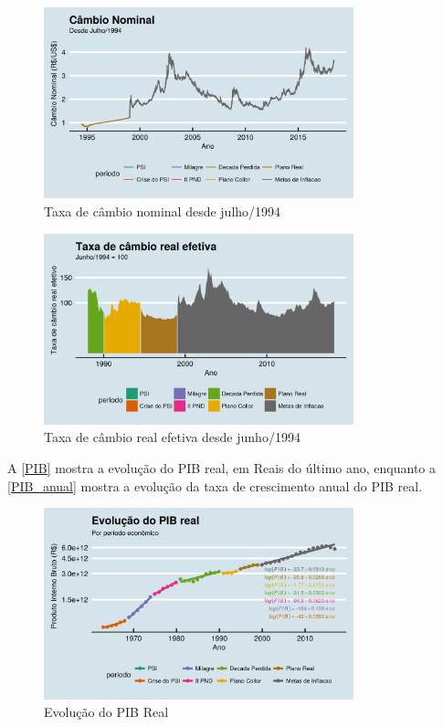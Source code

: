 \documentclass[
	10pt,				%
	openright,			%
	twoside,			%
	a5paper,			%
	english,			%
	french,				%
	spanish,			%
	brazil				%
	]{abntex2}
\begin{document}
\begin{figure}[htbp]
\caption{Taxa de câmbio nominal desde julho/1994}\label{cambio_nominal}
\begin{center}
\includegraphics[width=0.80000\textwidth]{imagens/cambio_nominal-1.png}
\end{center}
\end{figure}

\begin{figure}[htbp]
\caption{Taxa de câmbio real efetiva desde junho/1994}\label{cambio_real}
\begin{center}
\includegraphics[width=0.80000\textwidth]{imagens/cambio_real-1.png}
\end{center}
\end{figure}

A \autoref{PIB} mostra a evolução do PIB real, em Reais do último ano,
enquanto a \autoref{PIB_anual} mostra a evolução da taxa de crescimento
anual do PIB real.

\begin{figure}[htbp]
\caption{Evolução do PIB Real}\label{PIB}
\begin{center}
\includegraphics[width=0.80000\textwidth]{imagens/PIB-1.png}
\end{center}
\end{figure}
\end{document}
